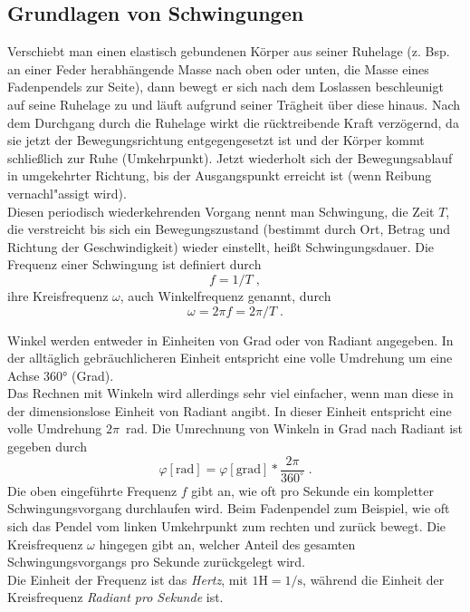 \subsection{Grundlagen von Schwingungen}

Verschiebt man einen elastisch gebundenen Körper aus seiner Ruhelage (z. Bsp. an einer Feder herabhängende Masse nach oben oder unten, die Masse eines Fadenpendels zur Seite), dann bewegt er sich nach dem Loslassen beschleunigt auf seine Ruhelage zu und läuft aufgrund seiner Trägheit über diese hinaus. Nach dem Durchgang durch die Ruhelage wirkt die rücktreibende Kraft verzögernd, da sie jetzt der Bewegungsrichtung entgegengesetzt ist und der Körper kommt schließlich zur Ruhe (Umkehrpunkt). Jetzt wiederholt sich der Bewegungsablauf in umgekehrter Richtung, bis der Ausgangspunkt erreicht ist (wenn Reibung vernachl"assigt wird). \\
Diesen periodisch wiederkehrenden Vorgang nennt man Schwingung, die Zeit $T$, die verstreicht bis sich ein Bewegungszustand (bestimmt durch Ort, Betrag und Richtung der Geschwindigkeit) wieder einstellt, hei{\ss}t Schwingungsdauer. Die Frequenz einer Schwingung ist definiert durch
\begin{equation}
f = 1/T \; ,
\end{equation}
ihre Kreisfrequenz $\omega$, auch Winkelfrequenz genannt, durch
\begin{equation}
\omega = 2\pi f = 2\pi /T\; .
\end{equation}
%
\begin{hint}
Winkel werden entweder in Einheiten von Grad oder von Radiant angegeben. In der alltäglich gebräuchlicheren Einheit entspricht eine volle Umdrehung um eine Achse 360° (Grad).\\
Das Rechnen mit Winkeln wird allerdings sehr viel einfacher, wenn man diese in der dimensionslose Einheit von Radiant angibt. In dieser Einheit entspricht eine volle Umdrehung $2\pi$~rad. Die Umrechnung von Winkeln in Grad nach Radiant ist gegeben durch
\begin{equation}
	\varphi \mathrm{\left[rad\right]} = \varphi \mathrm{\left[grad\right]}*\frac{2\pi}{360^{\circ}} \; .
\end{equation}
Die oben eingeführte Frequenz $f$ gibt an, wie oft pro Sekunde ein kompletter Schwingungsvorgang durchlaufen wird. Beim Fadenpendel zum Beispiel, wie oft sich das Pendel vom linken Umkehrpunkt zum rechten und zurück bewegt. Die Kreisfrequenz $\omega$ hingegen gibt an, welcher Anteil des gesamten Schwingungsvorgangs pro Sekunde zurückgelegt wird.\\Die Einheit der Frequenz ist das \textit{Hertz}, mit $1 \mathrm{H} = 1/\mathrm{s}$, während die Einheit der Kreisfrequenz \textit{Radiant pro Sekunde} ist.
\end{hint}
